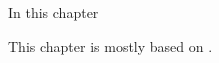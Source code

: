 \label{chap:confluent}

\noindent 
In this chapter 

This chapter is mostly based on \textcite{Tricomi:1954,Tricomi:1962}.
